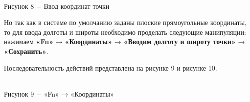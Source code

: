 \documentclass[a4paper]{article}
\begin{document}
{\begin{center}
     \\
    Рисунок 8 $-$ Ввод координат точки
\end{center}
\par Но так как в системе по умолчанию заданы плоские прямоугольные координаты, то для ввода долготы и широты необходимо проделать следующие манипуляции: нажимаем \textbf{«Fn»} → \textbf{«Координаты»} → \textbf{«Вводим долготу и широту точки»} → \textbf{«Сохранить»}. \par Последовательность действий представлена на рисунке 9 и рисунке 10.
\begin{center}
    \\
    Рисунок 9 $-$ «Fn» → «Координаты»
\end{center}
\begin{center}
    \\

\end{center}}
\end{document}
